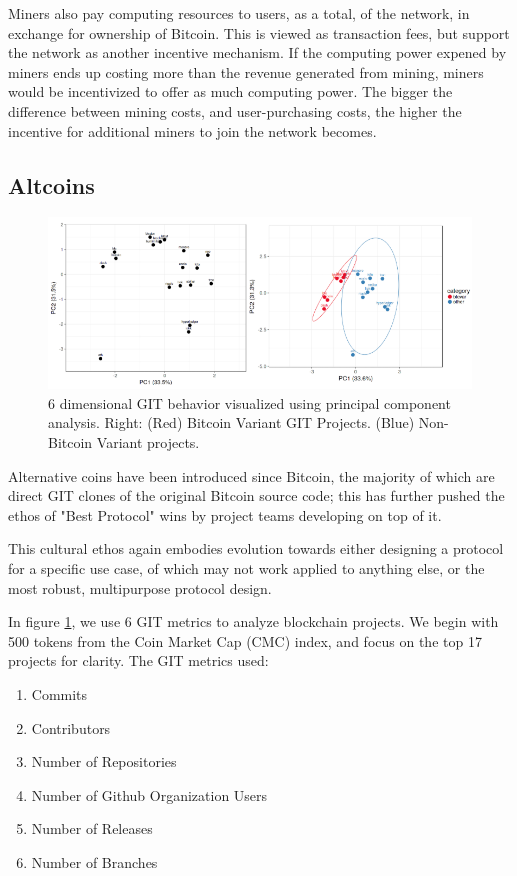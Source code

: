 \documentclass[12pt, titlepage, twocolumn]{report}
\begin{document}
Miners also pay computing resources to users, as a total, of the network, in exchange for ownership of Bitcoin. This is viewed as transaction fees, but support the network as another incentive mechanism. If the computing power expened by miners ends up costing more than the revenue generated from mining, miners would be incentivized to offer as much computing power. The bigger the difference between mining costs, and user-purchasing costs, the higher the incentive for additional miners to join the network becomes. 



\subsection{Altcoins}

\begin{figure}[ht]
\centering
	\includegraphics[width=\textwidth]{git_ana_both}
	\caption{6 dimensional GIT behavior visualized using principal component analysis. Right: (Red) Bitcoin Variant GIT Projects. (Blue) Non-Bitcoin Variant projects.}
	\label{git_ana_both}
\end{figure}


Alternative coins have been introduced since Bitcoin, the majority of which are direct GIT clones of the original Bitcoin source code; this has further pushed the ethos of "Best Protocol" wins by project teams developing on top of it.

This cultural ethos again embodies evolution towards either designing a protocol for a specific use case, of which may not work applied to anything else, or the most robust, multipurpose protocol design.

In figure \ref{git_ana_both}, we use 6 GIT metrics to analyze blockchain projects. We begin with 500 tokens from the Coin Market Cap (CMC) index, and focus on the top 17 projects for clarity. The GIT metrics used:

\begin{enumerate}
	\item Commits
	\item Contributors
	\item Number of Repositories
	\item Number of Github Organization Users
	\item Number of Releases
	\item Number of Branches
\end{enumerate}
\end{document}
